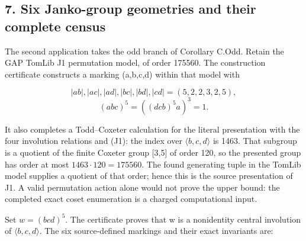\documentclass[
  11pt,
  a4paper,
]{article}
\begin{document}
\subsection{7. Six Janko-group geometries and their complete
census}\label{six-janko-group-geometries-and-their-complete-census}

The second application takes the odd branch of Corollary C.Odd. Retain
the GAP TomLib J1 permutation model, of order 175560. The construction
certificate constructs a marking (a,b,c,d) within that model with

\[
|ab|,|ac|,|ad|,|bc|,|bd|,|cd|=(5,2,2,3,2,5),
\] \[
(abc)^5=((dcb)^5a)^3=1.
\tag{J1}
\]

It also completes a Todd--Coxeter calculation for the literal
presentation with the four involution relations and (J1): the index over
\(\langle b,c,d\rangle\) is 1463. That subgroup is a quotient of the
finite Coxeter group {[}3,5{]} of order 120, so the presented group has
order at most \(1463·120=175560\). The found generating tuple in the
TomLib model supplies a quotient of that order; hence this is the source
presentation of J1. A valid permutation action alone would not prove the
upper bound: the completed exact coset enumeration is a charged
computational input.

Set \(w=(bcd)^5\). The certificate proves that w is a nonidentity
central involution of \(\langle b,c,d\rangle\). The six source-defined
markings and their exact invariants are:
\end{document}
